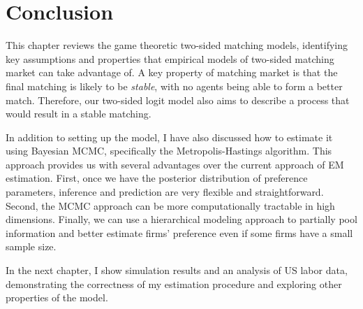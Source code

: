 \section{Conclusion}

This chapter reviews the game theoretic two-sided matching models, identifying
key assumptions and properties that empirical models of two-sided matching market
can take advantage of. A key property of matching market is that the final
matching is likely to be \textit{stable}, with no agents being able to form a
better match. Therefore, our two-sided logit model also aims to describe a
process that would result in a stable matching.

In addition to setting up the model, I have also discussed how to estimate it
using Bayesian MCMC, specifically the Metropolis-Hastings algorithm. This
approach provides us with several advantages over the current approach of EM
estimation. First, once we have the posterior distribution of preference
parameters, inference and prediction are very flexible and straightforward.
Second, the MCMC approach can be more computationally tractable in high
dimensions. Finally, we can use a hierarchical modeling approach to partially
pool information and better estimate firms' preference even if some firms have a
small sample size.

In the next chapter, I show simulation results and an analysis of US labor data,
demonstrating the correctness of my estimation procedure and exploring other
properties of the model.

